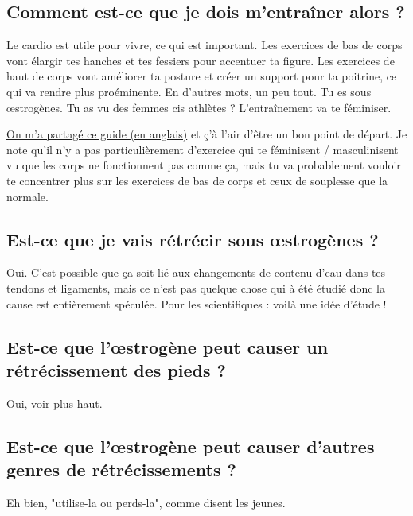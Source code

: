 \documentclass{article}
\begin{document}
\subsection{Comment est-ce que je dois m'entraîner alors ?}\label{11-16}

Le cardio est utile pour vivre, ce qui est important. Les exercices de bas de corps vont élargir tes hanches et tes fessiers pour accentuer ta figure. Les exercices de haut de corps vont améliorer ta posture et créer un support pour ta poitrine, ce qui va rendre plus proéminente. En d'autres mots, un peu tout. Tu es sous œstrogènes. Tu as vu des femmes cis athlètes ? L'entraînement va te féminiser.

\href{https://docs.google.com/document/d/1-NyE5EY5TTaRRMhk7HlTbKJ7HifjEsA4jlDO1qKQVl0/edit?tab=t.0}{On m'a partagé ce guide (en anglais)} et ç'à l'air d'être un bon point de départ. Je note qu'il n'y a pas particulièrement d'exercice qui te féminisent / masculinisent vu que les corps ne fonctionnent pas comme ça, mais tu va probablement vouloir te concentrer plus sur les exercices de bas de corps et ceux de souplesse que la normale.

\subsection{Est-ce que je vais rétrécir sous œstrogènes ?}

Oui. C'est possible que ça soit lié aux changements de contenu d'eau dans tes tendons et ligaments, mais ce n'est pas quelque chose qui à été étudié donc la cause est entièrement spéculée. Pour les scientifiques : voilà une idée d'étude !

\subsection{Est-ce que l'œstrogène peut causer un rétrécissement des pieds ?}

Oui, voir plus haut.

\subsection{Est-ce que l'œstrogène peut causer d'autres genres de rétrécissements ?}\label{11-19}

Eh bien, "utilise-la ou perds-la", comme disent les jeunes.
\end{document}
